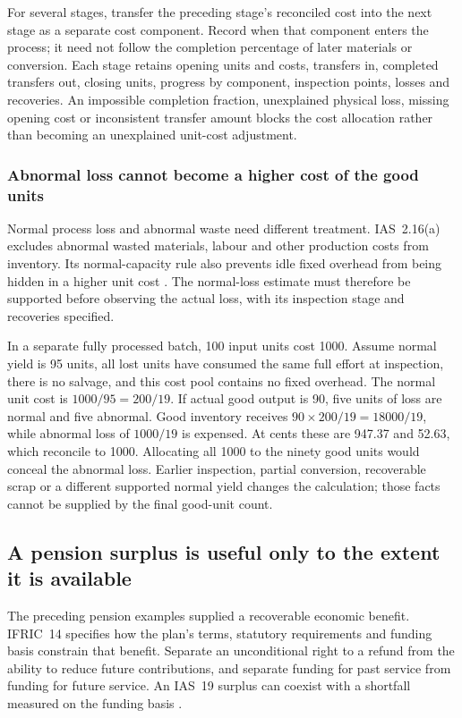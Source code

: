 For several stages, transfer the preceding stage's reconciled cost into
the next stage as a separate cost component. Record when that component
enters the process; it need not follow the completion percentage of later
materials or conversion. Each stage retains opening units and costs,
transfers in, completed transfers out, closing units, progress by component,
inspection points, losses and recoveries. An impossible completion fraction,
unexplained physical loss, missing opening cost or inconsistent transfer
amount blocks the cost allocation rather than becoming an unexplained
unit-cost adjustment.

\subsubsection{Abnormal loss cannot become a higher cost of the good units}
\label{sec:production-spoilage}

Normal process loss and abnormal waste need different treatment. IAS~2.16(a)
excludes abnormal wasted materials, labour and other production costs from
inventory. Its normal-capacity rule also prevents idle fixed overhead from
being hidden in a higher unit cost \citep[IAS~2.12--16, 21]{eu20231803}.
The normal-loss estimate must therefore be supported before observing the
actual loss, with its inspection stage and recoveries specified.

In a separate fully processed batch, 100 input units cost 1000. Assume
normal yield is 95 units, all lost units have consumed the same full effort
at inspection, there is no salvage, and this cost pool contains no fixed
overhead. The normal unit cost is \(1000/95=200/19\). If actual good
output is 90, five units of loss are normal and five abnormal. Good
inventory receives \(90\times200/19=18000/19\), while abnormal loss
of \(1000/19\) is expensed. At cents these are 947.37 and 52.63,
which reconcile to 1000. Allocating all 1000 to the ninety good units
would conceal the abnormal loss. Earlier inspection, partial conversion,
recoverable scrap or a different supported normal yield changes the
calculation; those facts cannot be supplied by the final good-unit count.

\subsection{A pension surplus is useful only to the extent it is available}
\label{sec:pension-funding-availability}

The preceding pension examples supplied a recoverable economic benefit.
IFRIC~14 specifies how the plan's terms, statutory requirements and funding
basis constrain that benefit. Separate an unconditional right to a refund
from the ability to reduce future contributions, and separate funding for
past service from funding for future service. An IAS~19 surplus can coexist
with a shortfall measured on the funding basis
\citep[IAS~19.64; IFRIC~14.7--24]{eu20231803}.

